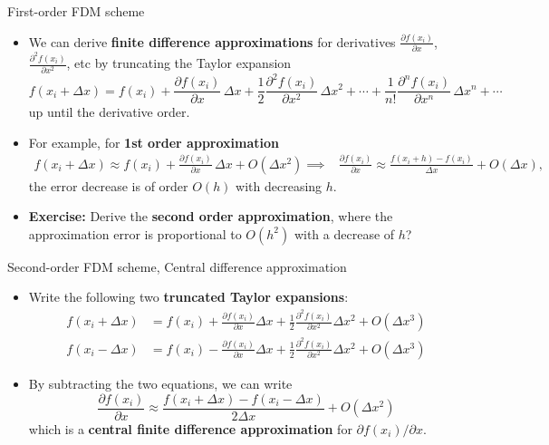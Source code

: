 %
%
\begin{frame}{First-order FDM scheme}
\begin{itemize}
\item We can derive \alert{\textbf{finite difference approximations}} for derivatives 
$\frac{\partial f(x_{i})}{\partial x}$, $\frac{\partial^{2}f(x_{i})}{\partial x^{2}}$, etc 
%
by truncating the Taylor expansion 
\[
f(x_{i}+\Delta x)=f(x_{i})+\frac{\partial f(x_{i})}{\partial x}\,\Delta x+\frac{1}{2}\frac{\partial^{2}f(x_{i})}{\partial x^{2}}\,\Delta x^{2}+\cdots+\frac{1}{n!}\frac{\partial^{n}f(x_{i})}{\partial x^{n}}\,\Delta x^{n}+\cdots
\]
%
up until the \alert{derivative order}. 
\pause
\item For example, for {\bf 1st order approximation}
\[
\begin{array}{ccc}
{\displaystyle f(x_{i}+\Delta x)\approx f(x_{i})+\frac{\partial f(x_{i})}{\partial x}\, \Delta x} + O (\Delta x^2) \implies & {\displaystyle \frac{\partial f(x_{i})}{\partial x}\approx\frac{f(x_{i}+h)-f(x_{i})}{\Delta x}} + O (\Delta x),
\end{array}
\]
the error decrease is of order $O (h)$ with decreasing $h$.
%
\pause
\item \alert{\textbf{Exercise:}} Derive the {\bf second order approximation}, where the approximation error is proportional to $O(h^{2})$ with a decrease of $h$?
%
\end{itemize}
\end{frame}
%
\begin{frame}{Second-order FDM scheme, Central difference approximation}
\begin{itemize}
\item Write the following two {\bf truncated Taylor expansions}:
\begin{align*}
f(x_{i}+\Delta x) & =f(x_{i})+\frac{\partial f(x_{i})}{\partial x}\Delta x+\frac{1}{2}\frac{\partial^{2}f(x_{i})}{\partial x^{2}}\Delta x^{2}+O(\Delta x^{3})\\
f(x_{i}-\Delta x) & =f(x_{i})-\frac{\partial f(x_{i})}{\partial x}\Delta x+\frac{1}{2}\frac{\partial^{2}f(x_{i})}{\partial x^{2}}\Delta x^{2}+O(\Delta x^{3})
\end{align*}
%
\pause
\item By subtracting the two equations, we can write
\[
\frac{\partial f(x_{i})}{\partial x}\approx\frac{f(x_{i}+\Delta x)-f(x_{i}-\Delta x)}{2\Delta x}+O(\Delta x^{2})
\]
which is a \alert{\bf central finite difference approximation} for $\partial f(x_{i})/\partial x$.
\end{itemize}
\end{frame}
